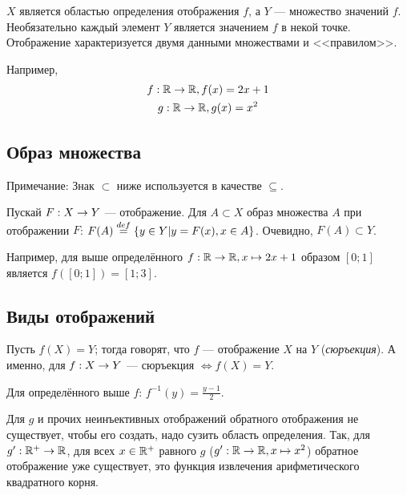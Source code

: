 \documentclass[a4paper]{report}
\begin{document}
    $X$ является областью определения отображения $f$, а $Y$ --- множество значений $f$.
    Необязательно каждый элемент $Y$ является значением $f$ в некой точке.
    Отображение характеризуется двумя данными множествами и <<правилом>>.

    Например,
    \begin{gather*}
        f : \mathbb{R} \rightarrow \mathbb{R}, f(x) = 2x + 1\\
        g : \mathbb{R} \rightarrow \mathbb{R}, g(x) = x^2\\
    \end{gather*}

    \subsection{Образ множества}

    Примечание: Знак $\subset$ ниже используется в качестве $\subseteq$.

    Пускай $F : X \rightarrow Y$ --- отображение.
    Для $A \subset X$ образ множества $A$ при отображении $F$: $F(A) \overset{def}{=} \{y \in Y | y = F(x), x \in A \}$.
    Очевидно, $F(A) \subset Y$.

    Например, для выше определённого $f : \mathbb{R} \rightarrow \mathbb{R}, x \mapsto 2x + 1$ образом $[0; 1]$ является $f([0; 1]) = [1; 3]$.

    \subsection{Виды отображений}

    Пусть $f(X) = Y$; тогда говорят, что $f$ --- отображение $X$ на $Y$ (\emph{сюръекция}).
    А именно, для $f : X \rightarrow Y$ --- сюръекция $\iff f(X) = Y$.


     Для определённого выше $f$: $f^{-1}(y) = \frac{y-1}{2}$.

    Для $g$ и прочих неинъективных отображений обратного отображения не существует, чтобы его создать, надо сузить область определения.
    Так, для $g' : \mathbb{R}^{+} \rightarrow \mathbb{R}$, для всех $x \in \mathbb{R}^+$ равного $g$ ($g' : \mathbb{R} \rightarrow \mathbb{R}, x \mapsto x^2$) обратное отображение уже существует, это функция извлечения арифметического квадратного корня.
\end{document}
